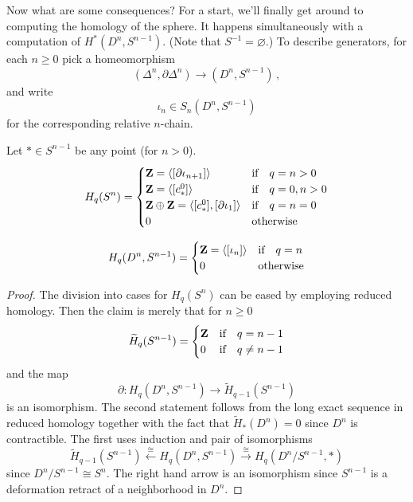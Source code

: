 Now what are some consequences? For a start, we'll finally get around
to computing the homology of the sphere. 
It happens simultaneously with a computation of 
$ H^\ast(D^n,S^{n-1})$. (Note that $S^{-1}=\varnothing$.)
To describe generators, for each $n\geq0$ pick a homeomorphism
\[
(\Delta^n,\partial\Delta^n)\to(D^n,S^{n-1})\,,
\]
and write 
\[
\iota_n\in S_n(D^n,S^{n-1})
\]
for the corresponding relative $n$-chain.
\begin{prop} Let $\ast\in S^{n-1}$ be any point (for $n>0$). 
	 \begin{equation*}
	 H_q(S^n)=\begin{cases}
\mathbf Z = \langle[\partial\iota_{n+1}]\rangle & \hbox{if}\quad q=n>0 \\ 
\mathbf Z = \langle[c^0_\ast]\rangle & \hbox{if}\quad q=0,n>0\\ 
\mathbf Z\oplus\mathbf Z = \langle[c^0_\ast],[\partial\iota_1]\rangle & \hbox{if}\quad  q=n=0 \\
0 & \hbox{otherwise} \end{cases}
	\end{equation*}

	\item \begin{equation*}
	 H_q(D^n,S^{n-1}) = \begin{cases}
	\mathbf Z=\langle [\iota_n]\rangle & \hbox{if}\quad q=n\\
	0 & \hbox{otherwise}
	\end{cases}
	\end{equation*}
\end{prop}

\begin{proof}
The division into cases for $H_q(S^n)$ can be eased by employing reduced 
homology. Then the claim is merely that for $n\geq0$
\[
\widetilde H_q(S^{n-1})=
\begin{cases}\mathbf Z & \hbox{if}\quad q=n-1 \\ 
0 & \hbox{if}\quad q\neq n-1\end{cases}
\]
and the map 
\[
\partial:H_q(D^n,S^{n-1})\to \widetilde H_{q-1}(S^{n-1})
\]
is an isomorphism.  The second statement follows from the long exact sequence
in reduced homology together with the fact that $\widetilde H_*(D^n)=0$ 
since $D^n$ is contractible. The first uses induction and pair of
isomorphisms
\[
\widetilde H_{q-1}(S^{n-1}) \xleftarrow{\cong}H_q(D^n,S^{n-1})
\xrightarrow{\cong}H_q(D^n/S^{n-1},\ast)
\]
since $D^n/S^{n-1}\cong S^n$. The right hand arrow is an isomorphism 
since $S^{n-1}$ is a deformation retract of a neighborhood in $D^n$.
\end{proof}

